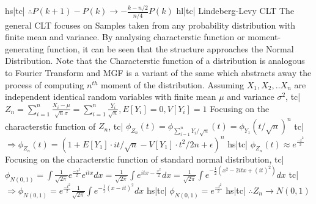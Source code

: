 hs|tc| \( \therefore P(k+1)-P(k) \rightarrow -\frac{k-n/2}{n/4}P(k) \)
hl|tc| Lindeberg-Levy CLT
The general CLT focuses on Samples taken from any probability distribution with finite mean and variance. By analysing characterstic function or moment-generating function, it can be seen that the structure approaches the Normal Distribution.
Note that the Characterstic function of a distribution is analogous to Fourier Transform and MGF is a variant of the same which abstracts away the process of computing \(n^{th}\) moment of the distribution.
Assuming \({X_1,X_2,..X_n}\) are independent identical random variables with finite mean \(\mu\) and variance \(\sigma^2\),
tc| \( Z_n = \sum_{i=1}^{n}\frac{X_i - \mu}{\sqrt{n}\sigma} = \sum_{i=1}^{n}\frac{Y_i}{\sqrt{n}}, E[Y_i] = 0, V[Y_i] = 1 \)
Focusing on the characterstic function of \(Z_n\),
tc| \( \phi_{Z_n}(t) = \phi_{\sum_{i=1}^{n}Y_i/\sqrt{n}}(t) = \phi_{Y_1}(t/\sqrt{n})^n \)
tc| \( \Rightarrow \phi_{Z_n}(t) = (1 + E[Y_1]\cdot it/\sqrt{n} - V[Y_1]\cdot t^2/2n + \epsilon)^n \)
hs|tc| \( \phi_{Z_n}(t) \approx e^{\frac{-t^2}{2}} \)
Focusing on the characterstic function of standard normal distribution,
tc| \( \phi_{N(0,1)} = \int \frac{1}{\sqrt{2\pi}} e^{\frac{-x^2}{2}} e^{itx} dx = \frac{1}{\sqrt{2\pi}} \int e^{itx - \frac{x^2}{2}} dx = \frac{1}{\sqrt{2\pi}} \int e^{-\frac{1}{2} (x^2 - 2itx + (it)^2)} dx \)
tc| \( \Rightarrow \phi_{N(0,1)} = e^{\frac{-t^2}{2}} \frac{1}{\sqrt{2\pi}} \int e^{-\frac{1}{2} (x - it)^2} dx \)
hs|tc| \( \phi_{N(0,1)} = e^{\frac{-t^2}{2}} \)
hs|tc| \( \therefore Z_n \rightarrow N(0, 1) \)
